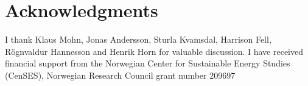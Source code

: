 \documentclass[12pt]{article}
\begin{document}
\section{Acknowledgments}
I thank Klaus Mohn, Jonas Andersson, Sturla Kvamsdal, Harrison Fell, R\"ognvaldur Hannesson and Henrik Horn for valuable discussion. I have received financial support from the Norwegian Center for Sustainable Energy Studies (CenSES), Norwegian Research Council grant number 209697 

\begin{spacing}{1}


\end{spacing}
\end{document}
